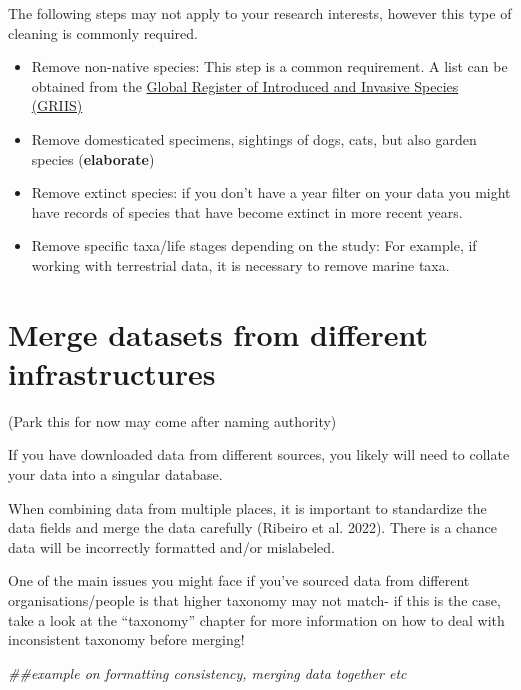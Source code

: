 \documentclass[
  letterpaper,
  DIV=11,
  numbers=noendperiod,
  oneside]{scrreprt}
\newenvironment{Shaded}{\begin{snugshade}}{\end{snugshade}}
\newcommand{\DocumentationTok}[1]{\textcolor[rgb]{0.37,0.37,0.37}{\textit{#1}}}
\begin{document}
The following steps may not apply to your research interests, however
this type of cleaning is commonly required.

\begin{itemize}
\item
  Remove non-native species: This step is a common requirement. A list
  can be obtained from the \href{https://griis.org/}{Global Register of
  Introduced and Invasive Species (GRIIS)}
\item
  Remove domesticated specimens, sightings of dogs, cats, but also
  garden species (\textbf{elaborate})
\item
  Remove extinct species: if you don't have a year filter on your data
  you might have records of species that have become extinct in more
  recent years.
\item
  Remove specific taxa/life stages depending on the study: For example,
  if working with terrestrial data, it is necessary to remove marine
  taxa.
\end{itemize}

\hypertarget{merge-datasets-from-different-infrastructures}{%
\section{Merge datasets from different
infrastructures}\label{merge-datasets-from-different-infrastructures}}

(Park this for now may come after naming authority)

If you have downloaded data from different sources, you likely will need
to collate your data into a singular database.

When combining data from multiple places, it is important to standardize
the data fields and merge the data carefully (Ribeiro et al. 2022).
There is a chance data will be incorrectly formatted and/or mislabeled.

One of the main issues you might face if you've sourced data from
different organisations/people is that higher taxonomy may not match- if
this is the case, take a look at the ``taxonomy'' chapter for more
information on how to deal with inconsistent taxonomy before merging!

\begin{Shaded}
\begin{Highlighting}[]
\DocumentationTok{\#\#example on formatting consistency, merging data together etc}
\end{Highlighting}
\end{Shaded}
\end{document}
